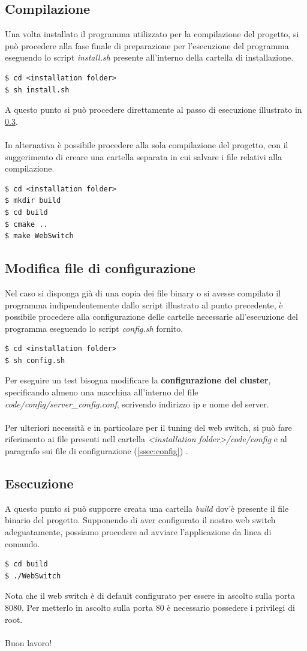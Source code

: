 \documentclass[italian]{tktltiki2}
\begin{document}
\subsection{Compilazione}
Una volta installato il programma utilizzato per la compilazione del progetto, si può procedere alla fase finale di preparazione per l'esecuzione del programma eseguendo lo script \emph{install.sh} presente all'interno della cartella di installazione.
\begin{lstlisting}
$ cd <installation folder>
$ sh install.sh 
\end{lstlisting}
A questo punto si può procedere direttamente al passo di esecuzione illustrato in \ref{ssec: execution}.
\\
\\
In alternativa è possibile procedere alla sola compilazione del progetto, con il suggerimento di creare una cartella separata in cui salvare i file relativi alla compilazione.
\begin{lstlisting}
$ cd <installation folder>
$ mkdir build
$ cd build
$ cmake ..
$ make WebSwitch
\end{lstlisting}
\subsection{Modifica file di configurazione} \label{ssec: configuration}
Nel caso si disponga già di una copia dei file binary o si avesse compilato il programma indipendentemente dallo script illustrato al punto precedente, è possibile procedere alla configurazione delle cartelle necessarie all'esecuzione del programma eseguendo lo script \emph{config.sh} fornito.
\begin{lstlisting}
$ cd <installation folder>
$ sh config.sh 
\end{lstlisting}
Per eseguire un test bisogna modificare la \textbf{configurazione del cluster}, specificando almeno una macchina all'interno del file \emph{code/config/server\_config.conf}, scrivendo indirizzo ip e nome del server.
\\\\
Per ulteriori necessità e in particolare per il tuning del web switch, si può fare riferimento ai file presenti nell cartella \emph{<installation folder>/code/config} e al paragrafo sui file di configurazione (\ref{ssec:config}) . 
\subsection{Esecuzione} \label{ssec: execution}
A questo punto si può supporre creata una cartella \emph{build} dov'è presente il file binario del progetto. Supponendo di aver configurato il nostro web switch adeguatamente, possiamo procedere ad avviare l'applicazione da linea di comando.
\begin{lstlisting}
$ cd build
$ ./WebSwitch  

\end{lstlisting}
Nota che il web switch è di default configurato per essere in ascolto sulla porta 8080. Per metterlo in ascolto sulla porta 80 è necessario possedere i privilegi di root.
\\
\\
Buon lavoro!
\newpage
\end{document}
